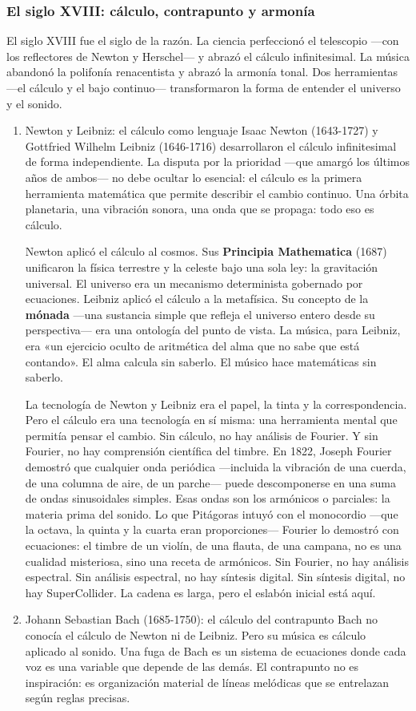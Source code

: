 \documentclass[14pt, a4paper]{article}
\begin{document}
\subsubsection{El siglo XVIII: cálculo, contrapunto y armonía}
\label{siglo-xviii}
El siglo XVIII fue el siglo de la razón. La ciencia perfeccionó el
telescopio —con los reflectores de Newton y Herschel— y abrazó el
cálculo infinitesimal. La música abandonó la polifonía renacentista y
abrazó la armonía tonal. Dos herramientas —el cálculo y el bajo
continuo— transformaron la forma de entender el universo y el sonido.
\begin{enumerate}
\item Newton y Leibniz: el cálculo como lenguaje
\label{newton-leibniz}
Isaac Newton (1643-1727) y Gottfried Wilhelm Leibniz (1646-1716)
desarrollaron el cálculo infinitesimal de forma independiente. La
disputa por la prioridad —que amargó los últimos años de ambos— no
debe ocultar lo esencial: el cálculo es la primera herramienta
matemática que permite describir el cambio continuo. Una órbita
planetaria, una vibración sonora, una onda que se propaga: todo eso
es cálculo.

Newton aplicó el cálculo al cosmos. Sus \textbf{Principia Mathematica} (1687)
unificaron la física terrestre y la celeste bajo una sola ley: la
gravitación universal. El universo era un mecanismo determinista
gobernado por ecuaciones. Leibniz aplicó el cálculo a la metafísica.
Su concepto de la \textbf{mónada} —una sustancia simple que refleja el
universo entero desde su perspectiva— era una ontología del punto de
vista. La música, para Leibniz, era «un ejercicio oculto de aritmética
del alma que no sabe que está contando». El alma calcula sin saberlo.
El músico hace matemáticas sin saberlo.

La tecnología de Newton y Leibniz era el papel, la tinta y la
correspondencia. Pero el cálculo era una tecnología en sí misma: una
herramienta mental que permitía pensar el cambio. Sin cálculo,
no hay análisis de Fourier. Y sin Fourier, no hay comprensión
científica del timbre. En 1822, Joseph Fourier demostró que cualquier
onda periódica —incluida la vibración de una cuerda, de una columna
de aire, de un parche— puede descomponerse en una suma de
ondas sinusoidales simples. Esas ondas son los armónicos o parciales:
la materia prima del sonido. Lo que Pitágoras intuyó con el monocordio
—que la octava, la quinta y la cuarta eran proporciones— Fourier lo
demostró con ecuaciones: el timbre de un violín, de una flauta, de una
campana, no es una cualidad misteriosa, sino una receta de armónicos.
Sin Fourier, no hay análisis espectral. Sin análisis espectral, no hay
síntesis digital. Sin síntesis digital, no hay SuperCollider. La
cadena es larga, pero el eslabón inicial está aquí.
\item Johann Sebastian Bach (1685-1750): el cálculo del contrapunto
\label{bach}
Bach no conocía el cálculo de Newton ni de Leibniz. Pero su música es
cálculo aplicado al sonido. Una fuga de Bach es un sistema de
ecuaciones donde cada voz es una variable que depende de las demás. El
contrapunto no es inspiración: es organización material de líneas
melódicas que se entrelazan según reglas precisas.


\end{enumerate}
\end{document}
